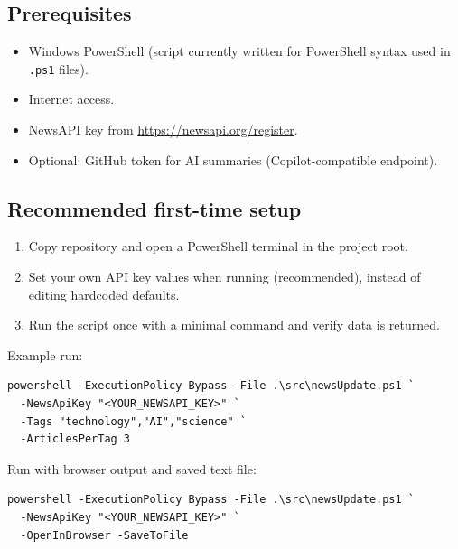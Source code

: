 \documentclass[11pt,a4paper]{article}
\begin{document}
\subsection{Prerequisites}
\begin{itemize}
  \item Windows PowerShell (script currently written for PowerShell syntax used in \texttt{.ps1} files).
  \item Internet access.
  \item NewsAPI key from \url{https://newsapi.org/register}.
  \item Optional: GitHub token for AI summaries (Copilot-compatible endpoint).
\end{itemize}

\subsection{Recommended first-time setup}
\begin{enumerate}
  \item Copy repository and open a PowerShell terminal in the project root.
  \item Set your own API key values when running (recommended), instead of editing hardcoded defaults.
  \item Run the script once with a minimal command and verify data is returned.
\end{enumerate}

Example run:
\begin{verbatim}
powershell -ExecutionPolicy Bypass -File .\src\newsUpdate.ps1 `
  -NewsApiKey "<YOUR_NEWSAPI_KEY>" `
  -Tags "technology","AI","science" `
  -ArticlesPerTag 3
\end{verbatim}

Run with browser output and saved text file:
\begin{verbatim}
powershell -ExecutionPolicy Bypass -File .\src\newsUpdate.ps1 `
  -NewsApiKey "<YOUR_NEWSAPI_KEY>" `
  -OpenInBrowser -SaveToFile
\end{verbatim}
\end{document}
